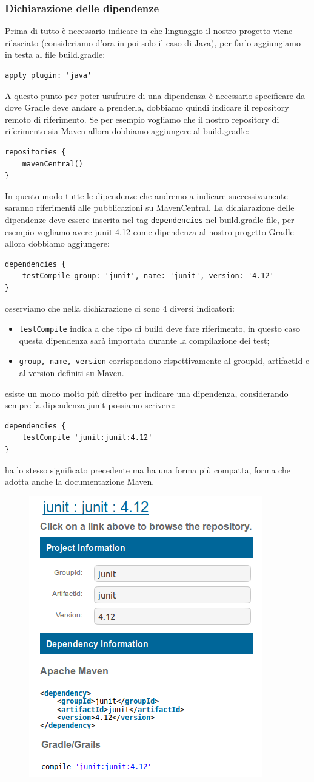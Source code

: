 \subsubsection{Dichiarazione delle dipendenze}
Prima di tutto è necessario indicare in che linguaggio il nostro progetto viene rilasciato (consideriamo d'ora in poi solo il caso di Java), per farlo aggiungiamo in testa al file build.gradle:
\begin{verbatim}
apply plugin: 'java' \end{verbatim}
A questo punto per poter usufruire di una dipendenza è necessario specificare da dove Gradle deve andare a prenderla, dobbiamo quindi indicare il repository remoto di riferimento. Se per esempio vogliamo che il nostro repository di riferimento sia Maven allora dobbiamo aggiungere al build.gradle:
\begin{verbatim}
repositories {
    mavenCentral()
} \end{verbatim}
In questo modo tutte le dipendenze che andremo a indicare successivamente saranno riferimenti alle pubblicazioni su MavenCentral. La dichiarazione delle dipendenze deve essere inserita nel tag \texttt{dependencies} nel build.gradle file, per esempio vogliamo avere junit 4.12 come dipendenza al nostro progetto Gradle allora dobbiamo aggiungere:
\begin{verbatim}
dependencies {
    testCompile group: 'junit', name: 'junit', version: '4.12' 
} \end{verbatim}
osserviamo che nella dichiarazione ci sono 4 diversi indicatori:
\begin{itemize}
    \item \texttt{testCompile} indica a che tipo di build deve fare riferimento, in questo caso questa dipendenza sarà importata durante la compilazione dei test;
    \item \texttt{group, name, version} corrispondono rispettivamente al groupId, artifactId e al version definiti su Maven.
\end{itemize}
esiste un modo molto più diretto per indicare una dipendenza, considerando sempre la dipendenza junit possiamo scrivere:
\begin{verbatim}
dependencies {
    testCompile 'junit:junit:4.12'
} \end{verbatim}
ha lo stesso significato precedente ma ha una forma più compatta, forma che adotta anche la documentazione Maven.
\begin{figure}[H]
\centering
\includegraphics[width=0.4\linewidth]{Tutorial/third/gradleInMavenRepo.png}
\end{figure} 
